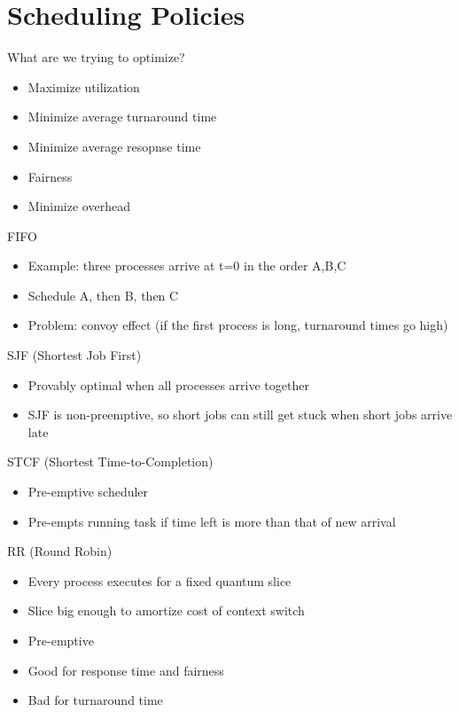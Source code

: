 \documentclass[12pt]{article}
\begin{document}
\section{Scheduling Policies}

What are we trying to optimize?
\begin{itemize}
    \item Maximize utilization
    \item Minimize average turnaround time
    \item Minimize average resopnse time
    \item Fairness
    \item Minimize overhead 
\end{itemize}

FIFO
\begin{itemize}
    \item Example: three processes arrive at t=0 in the order A,B,C
    \item Schedule A, then B, then C
    \item Problem: convoy effect (if the first process is long, turnaround times go high)
\end{itemize}

SJF (Shortest Job First)
\begin{itemize}
    \item Provably optimal when all processes arrive together
    \item SJF is non-preemptive, so short jobs can still get stuck when short jobs arrive late
\end{itemize}

STCF (Shortest Time-to-Completion)
\begin{itemize}
    \item Pre-emptive scheduler
    \item Pre-empts running task if time left is more than that of new arrival 
\end{itemize}

RR (Round Robin)
\begin{itemize}
    \item Every process executes for a fixed quantum slice
    \item Slice big enough to amortize cost of context switch
    \item Pre-emptive
    \item Good for response time and fairness
    \item Bad for turnaround time 
\end{itemize}
\end{document}
